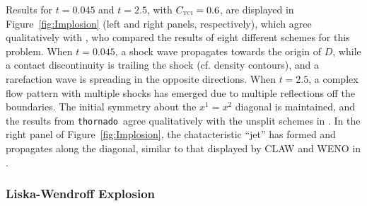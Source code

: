 \documentclass[letterpaper]{jpconf}
\newcommand{\TCI}{\textnormal{\tiny\textsc{TCI}}}
\newcommand{\thornado}{\texttt{thornado}}
\begin{document}
Results for $t=0.045$ and $t=2.5$, with $C_{\TCI}=0.6$, are displayed in Figure~\ref{fig:Implosion} (left and right panels, respectively), which agree qualitatively with \cite{liskaWendroff_2003}, who compared the results of eight different schemes for this problem.  
When $t=0.045$, a shock wave propagates towards the origin of $D$, while a contact discontinuity is trailing the shock (cf. density contours), and a rarefaction wave is spreading in the opposite directions.  
When $t=2.5$, a complex flow pattern with multiple shocks has emerged due to multiple reflections off the boundaries.  
The initial symmetry about the $x^{1}=x^{2}$ diagonal is maintained, and the results from \thornado\ agree qualitatively with the unsplit schemes in \cite{liskaWendroff_2003}.  
In the right panel of Figure~\ref{fig:Implosion}, the chatacteristic ``jet'' has formed and propagates along the diagonal, similar to that displayed by CLAW and WENO in \cite{liskaWendroff_2003}.  

\subsubsection{Liska-Wendroff Explosion}
\end{document}
